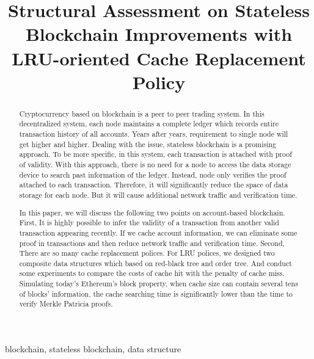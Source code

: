 \documentclass[conference]{IEEEtran}
\begin{document}
\title{Structural Assessment on Stateless Blockchain Improvements with
LRU-oriented Cache Replacement Policy}


\maketitle

\begin{abstract}
Cryptocurrency based on blockchain is a peer to peer trading
system. In this decentralized system,
each node maintains a complete ledger which
records entire transaction history of all accounts.
Years after years, requirement to single node will
get higher and higher. Dealing with the issue, stateless
blockchain is a promising approach. To be more specific,
in this system, each transaction is attached with proof
of validity. With this approach, there is no need for a node
to access the data storage device to search past information
of the ledger. Instead, node only verifies the proof attached
to each transaction. Therefore, it will significantly
reduce the space of data storage for each node.
But it will cause additional network traffic and
verification time.

In this paper, we will discuss the following two points
on account-based blockchain.
First,
It is highly possible to infer the validity of
a transaction from another valid transaction appearing recently.
If we cache account information, we can eliminate some
proof in transactions and then reduce network traffic
and verification time.
Second,
There are so many cache replacement polices.
For LRU polices, we designed two composite data
structures which based on red-black tree and order tree.
And conduct some experiments to compare the costs of
cache hit with the penalty of cache miss.
Simulating today's Ethereum's block property,
when cache size can contain several tens of blocks' information,
the cache searching time is significantly lower than
the time to verify Merkle Patricia proofs.
\end{abstract}

\begin{IEEEkeywords}
blockchain, stateless blockchain, data structure
\end{IEEEkeywords}
\end{document}
